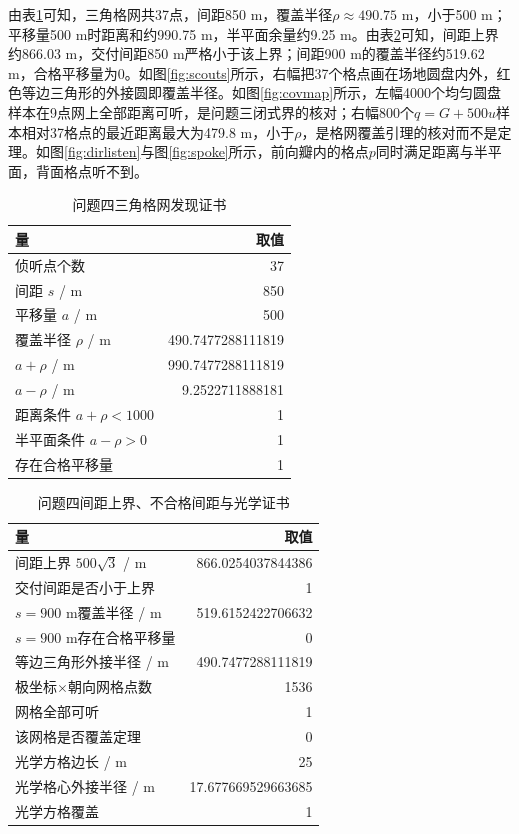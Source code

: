 \documentclass{cumcmthesis}
\begin{document}
由表\ref{tab:q4cov}可知，三角格网共37点，间距850 m，覆盖半径$\rho\approx 490.75$ m，小于500 m；平移量500 m时距离和约990.75 m，半平面余量约9.25 m。由表\ref{tab:q4cert}可知，间距上界约866.03 m，交付间距850 m严格小于该上界；间距900 m的覆盖半径约519.62 m，合格平移量为0。如图\ref{fig:scouts}所示，右幅把37个格点画在场地圆盘内外，红色等边三角形的外接圆即覆盖半径。如图\ref{fig:covmap}所示，左幅4000个均匀圆盘样本在9点网上全部距离可听，是问题三闭式界的核对；右幅800个$q=G+500u$样本相对37格点的最近距离最大为479.8 m，小于$\rho$，是格网覆盖引理的核对而不是定理。如图\ref{fig:dirlisten}与图\ref{fig:spoke}所示，前向瓣内的格点$p$同时满足距离与半平面，背面格点听不到。

\begin{table}[htbp]
\centering
\caption{问题四三角格网发现证书}
\label{tab:q4cov}
\begin{tabular}{lr}
\toprule
量 & 取值 \\
\midrule
侦听点个数 & 37 \\
间距 $s$ / m & 850 \\
平移量 $a$ / m & 500 \\
覆盖半径 $\rho$ / m & 490.7477288111819 \\
$a+\rho$ / m & 990.7477288111819 \\
$a-\rho$ / m & 9.2522711888181 \\
距离条件 $a+\rho<1000$ & 1 \\
半平面条件 $a-\rho>0$ & 1 \\
存在合格平移量 & 1 \\
\bottomrule
\end{tabular}
\end{table}

\begin{table}[htbp]
\centering
\caption{问题四间距上界、不合格间距与光学证书}
\label{tab:q4cert}
\begin{tabular}{lr}
\toprule
量 & 取值 \\
\midrule
间距上界 $500\sqrt{3}$ / m & 866.0254037844386 \\
交付间距是否小于上界 & 1 \\
$s=900$ m覆盖半径 / m & 519.6152422706632 \\
$s=900$ m存在合格平移量 & 0 \\
等边三角形外接半径 / m & 490.7477288111819 \\
极坐标$\times$朝向网格点数 & 1536 \\
网格全部可听 & 1 \\
该网格是否覆盖定理 & 0 \\
光学方格边长 / m & 25 \\
光学格心外接半径 / m & 17.677669529663685 \\
光学方格覆盖 & 1 \\
\bottomrule
\end{tabular}
\end{table}
\end{document}
